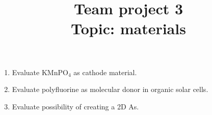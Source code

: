 \documentclass{Project}
\begin{document}
\title{Team project 3 \\ Topic: materials}
\maketitle

\preface{}

\begin{enumerate}
\item Evaluate KMnPO$_4$ as cathode material.
\item Evaluate polyfluorine as molecular donor in organic solar cells.
\item Evaluate possibility of creating a 2D As.
\end{enumerate}

\reminder{}
\end{document}
